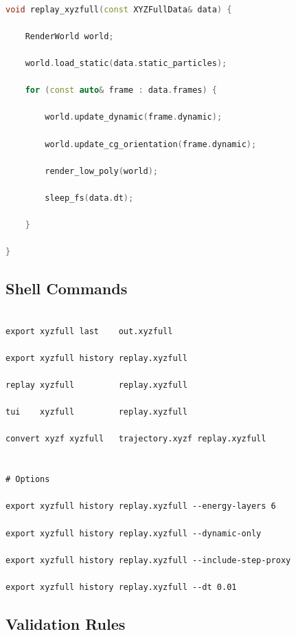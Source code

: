 \documentclass[12pt, a4paper, oneside]{article}
\begin{document}
\begin{lstlisting}[language=C++]

void replay_xyzfull(const XYZFullData& data) {

    RenderWorld world;

    world.load_static(data.static_particles);

    for (const auto& frame : data.frames) {

        world.update_dynamic(frame.dynamic);

        world.update_cg_orientation(frame.dynamic);

        render_low_poly(world);

        sleep_fs(data.dt);

    }

}

\end{lstlisting}


\subsection{Shell Commands}


\begin{lstlisting}[language={},frame=single]

export xyzfull last    out.xyzfull

export xyzfull history replay.xyzfull

replay xyzfull         replay.xyzfull

tui    xyzfull         replay.xyzfull

convert xyzf xyzfull   trajectory.xyzf replay.xyzfull


# Options

export xyzfull history replay.xyzfull --energy-layers 6

export xyzfull history replay.xyzfull --dynamic-only

export xyzfull history replay.xyzfull --include-step-proxy

export xyzfull history replay.xyzfull --dt 0.01

\end{lstlisting}


\subsection{Validation Rules}
\end{document}
